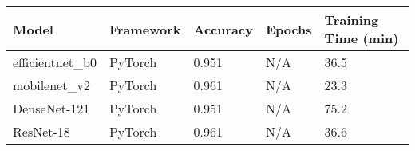 \begin{tabular}{lllll}
\toprule
Model & Framework & Accuracy & Epochs & Training Time (min) \\
\midrule
efficientnet_b0 & PyTorch & 0.951 & N/A & 36.5 \\
mobilenet_v2 & PyTorch & 0.961 & N/A & 23.3 \\
DenseNet-121 & PyTorch & 0.951 & N/A & 75.2 \\
ResNet-18 & PyTorch & 0.961 & N/A & 36.6 \\
\bottomrule
\end{tabular}
